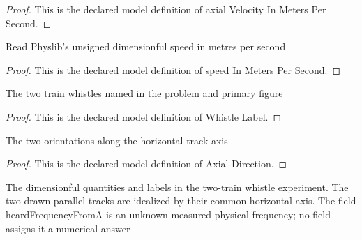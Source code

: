 \begin{proof}
  This is the declared model definition of axial Velocity In Meters Per Second.
\end{proof}
\begin{definition}
  \label{def:physics:phyx-mini-0171:phyxminiproblems-problemphyxmini0171-speedinmeterspersecond}
  Read Physlib's unsigned dimensionful speed in metres per second
\end{definition}
\begin{proof}
  This is the declared model definition of speed In Meters Per Second.
\end{proof}
\begin{definition}
  \label{def:physics:phyx-mini-0171:phyxminiproblems-problemphyxmini0171-whistlelabel}
  The two train whistles named in the problem and primary figure
\end{definition}
\begin{proof}
  This is the declared model definition of Whistle Label.
\end{proof}
\begin{definition}
  \label{def:physics:phyx-mini-0171:phyxminiproblems-problemphyxmini0171-axialdirection}
  The two orientations along the horizontal track axis
\end{definition}
\begin{proof}
  This is the declared model definition of Axial Direction.
\end{proof}
\begin{definition}
  \label{def:physics:phyx-mini-0171:phyxminiproblems-problemphyxmini0171-twotrainwhistlesetup}
  The dimensionful quantities and labels in the two-train whistle experiment. The two drawn parallel tracks are idealized by their common horizontal axis. The field heardFrequencyFromA is an unknown measured physical frequency; no field assigns it a numerical answer
\end{definition}
